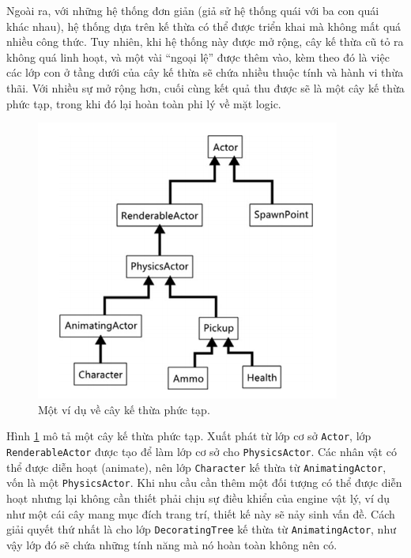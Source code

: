 \documentclass[12pt]{report}
\begin{document}
Ngoài ra, với những hệ thống đơn giản (giả sử hệ thống quái với ba con quái khác nhau), hệ thống dựa trên kế thừa có thể được triển khai mà không mất quá nhiều công thức. Tuy nhiên, khi hệ thống này được mở rộng, cây kế thừa cũ tỏ ra không quá linh hoạt, và một vài ``ngoại lệ'' được thêm vào, kèm theo đó là việc các lớp con ở tầng dưới của cây kế thừa sẽ chứa nhiều thuộc tính và hành vi thừa thãi. Với nhiều sự mở rộng hơn, cuối cùng kết quả thu được sẽ là một cây kế thừa phức tạp, trong khi đó lại hoàn toàn phi lý về mặt logic.
\begin{figure}[H]
  \centering
    \includegraphics[width=10cm]{Pics/Chap4/inheritance.png}
  \caption{Một ví dụ về cây kế thừa phức tạp\cite{gamecodingcomplete}.} 
  \label{fig:hierarchy}
\end{figure}

Hình \ref{fig:hierarchy} mô tả một cây kế thừa phức tạp. Xuất phát từ lớp cơ sở \texttt{Actor}, lớp \texttt{RenderableActor} được tạo để làm lớp cơ sở cho \texttt{PhysicsActor}. Các nhân vật có thể được diễn hoạt (animate), nên lớp \texttt{Character} kế thừa từ \texttt{AnimatingActor}, vốn là một \texttt{PhysicsActor}. Khi nhu cầu cần thêm một đối tượng có thể được diễn hoạt nhưng lại không cần thiết phải chịu sự điều khiển của engine vật lý, ví dụ như một cái cây mang mục đích trang trí, thiết kế này sẽ nảy sinh vấn đề. Cách giải quyết thứ nhất là cho lớp \texttt{DecoratingTree} kế thừa từ \texttt{AnimatingActor}, như vậy lớp đó sẽ chứa những tính năng mà nó hoàn toàn không nên có. 
\end{document}
